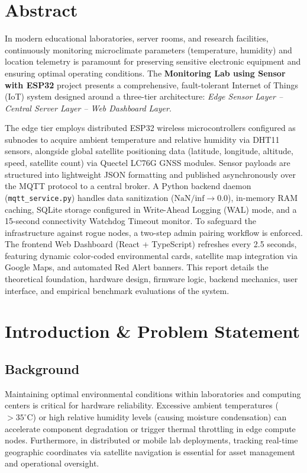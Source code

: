 \documentclass[11pt,a4paper]{article}
\begin{document}
\newpage
\tableofcontents
\newpage

\section*{Abstract}
In modern educational laboratories, server rooms, and research facilities, continuously monitoring microclimate parameters (temperature, humidity) and location telemetry is paramount for preserving sensitive electronic equipment and ensuring optimal operating conditions. The \textbf{Monitoring Lab using Sensor with ESP32} project presents a comprehensive, fault-tolerant Internet of Things (IoT) system designed around a three-tier architecture: \textit{Edge Sensor Layer -- Central Server Layer -- Web Dashboard Layer}.

The edge tier employs distributed ESP32 wireless microcontrollers configured as subnodes to acquire ambient temperature and relative humidity via DHT11 sensors, alongside global satellite positioning data (latitude, longitude, altitude, speed, satellite count) via Quectel LC76G GNSS modules. Sensor payloads are structured into lightweight JSON formatting and published asynchronously over the MQTT protocol to a central broker. A Python backend daemon (\texttt{mqtt\_service.py}) handles data sanitization ($\text{NaN}/\text{inf} \to 0.0$), in-memory RAM caching, SQLite storage configured in Write-Ahead Logging (WAL) mode, and a 15-second connectivity Watchdog Timeout monitor. To safeguard the infrastructure against rogue nodes, a two-step admin pairing workflow is enforced. The frontend Web Dashboard (React + TypeScript) refreshes every 2.5 seconds, featuring dynamic color-coded environmental cards, satellite map integration via Google Maps, and automated Red Alert banners. This report details the theoretical foundation, hardware design, firmware logic, backend mechanics, user interface, and empirical benchmark evaluations of the system.

\newpage

\section{Introduction \& Problem Statement}

\subsection{Background}
Maintaining optimal environmental conditions within laboratories and computing centers is critical for hardware reliability. Excessive ambient temperatures ($>35^\circ\text{C}$) or high relative humidity levels (causing moisture condensation) can accelerate component degradation or trigger thermal throttling in edge compute nodes. Furthermore, in distributed or mobile lab deployments, tracking real-time geographic coordinates via satellite navigation is essential for asset management and operational oversight.
\end{document}
